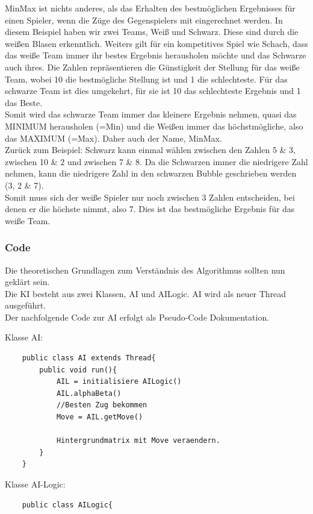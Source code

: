 \documentclass[12pt,a4paper]{article}
\begin{document}
{MinMax ist nichts anderes, als das Erhalten des bestmöglichen Ergebnisses für einen Spieler, wenn die Züge des Gegenspielers mit eingerechnet werden. In diesem Beispiel haben wir zwei Teams, Weiß und Schwarz. Diese sind durch die weißen Blasen erkenntlich. Weiters gilt für ein kompetitives Spiel wie Schach, dass das weiße Team immer ihr bestes Ergebnis herausholen möchte und das Schwarze auch ihres. Die Zahlen repräsentieren die Günstigkeit der Stellung für das weiße Team, wobei 10 die bestmögliche Stellung ist und 1 die schlechteste. Für das schwarze Team ist dies umgekehrt, für sie ist 10 das schlechteste Ergebnis und 1 das Beste. \\
Somit wird das schwarze Team immer das kleinere Ergebnis nehmen, quasi das MINIMUM herausholen (=Min) und die Weißen immer das höchstmögliche, also das MAXIMUM (=Max). Daher auch der Name, MinMax. \\
Zurück zum Beispiel: Schwarz kann einmal wählen zwischen den Zahlen 5 \& 3, zwischen 10 \& 2 und zwischen 7 \& 8. Da die Schwarzen immer die niedrigere Zahl nehmen, kann die niedrigere Zahl in den schwarzen Bubble geschrieben werden (3, 2 \& 7). \\
Somit muss sich der weiße Spieler nur noch zwischen 3 Zahlen entscheiden, bei denen er die höchste nimmt, also 7. Dies ist das bestmögliche Ergebnis für das weiße Team.

\subsubsection{Code}
\label{SUBSUBSEC:AICODE}

Die theoretischen Grundlagen zum Verständnis des Algorithmus sollten nun geklärt sein.\\
Die KI besteht aus zwei Klassen, AI und AILogic. AI wird als neuer Thread ausgeführt. \\
Der nachfolgende Code zur AI erfolgt als Pseudo-Code Dokumentation.


Klasse AI:

\lstset{language=Java}
\begin{lstlisting}
	public class AI extends Thread{
		public void run(){
			AIL = initialisiere AILogic()
			AIL.alphaBeta()
			//Besten Zug bekommen
			Move = AIL.getMove()
			
			Hintergrundmatrix mit Move veraendern.
		}
	}	
\end{lstlisting}

Klasse AI-Logic:
\lstset{language=Java}
\begin{lstlisting}
	public class AILogic{
	

\end{lstlisting}}
\end{document}
